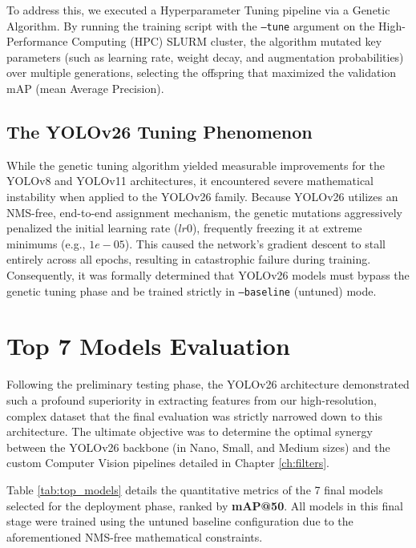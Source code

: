 To address this, we executed a Hyperparameter Tuning pipeline via a Genetic Algorithm. By running the training script with the \texttt{--tune} argument on the High-Performance Computing (HPC) SLURM cluster, the algorithm mutated key parameters (such as learning rate, weight decay, and augmentation probabilities) over multiple generations, selecting the offspring that maximized the validation mAP (mean Average Precision).

\subsection{The YOLOv26 Tuning Phenomenon}
While the genetic tuning algorithm yielded measurable improvements for the YOLOv8 and YOLOv11 architectures, it encountered severe mathematical instability when applied to the YOLOv26 family. Because YOLOv26 utilizes an NMS-free, end-to-end assignment mechanism, the genetic mutations aggressively penalized the initial learning rate ($lr0$), frequently freezing it at extreme minimums (e.g., $1e-05$). This caused the network's gradient descent to stall entirely across all epochs, resulting in catastrophic failure during training. Consequently, it was formally determined that YOLOv26 models must bypass the genetic tuning phase and be trained strictly in \texttt{--baseline} (untuned) mode.

\section{Top 7 Models Evaluation}
Following the preliminary testing phase, the YOLOv26 architecture demonstrated such a profound superiority in extracting features from our high-resolution, complex dataset that the final evaluation was strictly narrowed down to this architecture. The ultimate objective was to determine the optimal synergy between the YOLOv26 backbone (in Nano, Small, and Medium sizes) and the custom Computer Vision pipelines detailed in Chapter \ref{ch:filters}.

Table \ref{tab:top_models} details the quantitative metrics of the 7 final models selected for the deployment phase, ranked by \textbf{mAP@50}. All models in this final stage were trained using the untuned baseline configuration due to the aforementioned NMS-free mathematical constraints.

